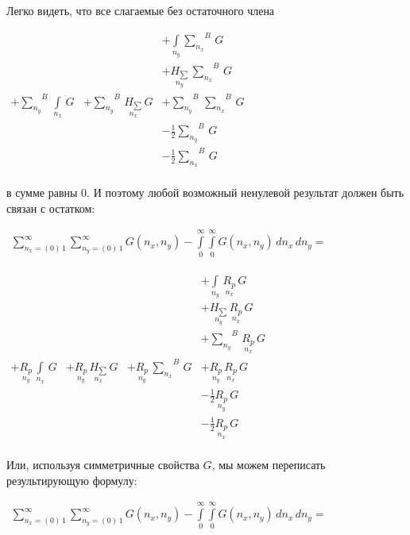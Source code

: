 \documentclass[11pt]{article}
\begin{document}
    Легко видеть, что все слагаемые без остаточного члена

    \(\begin{array}{llll}  \,&  \,&  + \int\limits_{n_y}^{}{\sum\limits_{n_x}^{}}^{B}\,G \\  \,&  \,&  + \underset{n_y}{H_{\sum}}\,{\sum\limits_{n_x}^{}}^{B}\,G \\  + {\sum\limits_{n_y}^{}}^{B}\,\int\limits_{n_x}^{}\,G &  + {\sum\limits_{n_y}^{}}^{B}\,\underset{n_x}{H_{\sum}}\,G &  + {\sum\limits_{n_y}^{}}^{B}\,{\sum\limits_{n_x}^{}}^{B}\,G\\  \,&  \,&  - \frac{1}{2}{\sum\limits_{n_y}^{}}^{B}\,G \\  \,&  \,&  - \frac{1}{2}{\sum\limits_{n_x}^{}}^{B}\,G \\ \end{array}\)

    в сумме равны 0. И поэтому любой возможный ненулевой результат должен
быть связан с остатком:

    \(\begin{array}{r} \sum\limits_{n_x=\left(0\right)\,1}^{\infty} \sum\limits_{n_y=\left(0\right)\,1}^{\infty} G\left(n_x, n_y\right) - \int\limits_{0}^{\infty} \int\limits_{0}^{\infty} G\left(n_x, n_y\right)\,d{n_x}\,d{n_y} = \end{array}\)

    \(\begin{array}{llll}  \,&  \,&  \,&  + \int\limits_{n_y}^{}\,\underset{n_x}{R_{p}}\,G \\  \,&  \,&  \,&  + \underset{n_y}{H_{\sum}}\,\underset{n_x}{R_{p}}\,G \\  \,&  \,&  \,&  + {\sum\limits_{n_y}^{}}^{B}\,\underset{n_x}{R_{p}}\,G \\  + \underset{n_y}{R_{p}}\,\int\limits_{n_x}^{}\,G &  + \underset{n_y}{R_{p}}\,\underset{n_x}{H_{\sum}}\,G &  + \underset{n_y}{R_{p}}\,{\sum\limits_{n_x}^{}}^{B}\,G &  + \underset{n_y}{R_{p}}\,\underset{n_x}{R_{p}}\,G \\  \,&  \,&  \,&  - \frac{1}{2}\underset{n_y}{R_{p}}\,G \\  \,&  \,&  \,&  - \frac{1}{2}\underset{n_x}{R_{p}}\,G \\ \end{array}\)

    Или, используя симметричные свойства \(G\), мы можем переписать
результирующую формулу:

    \(\begin{array}{r} \sum\limits_{n_x=\left(0\right)\,1}^{\infty} \sum\limits_{n_y=\left(0\right)\,1}^{\infty} G\left(n_x, n_y\right) - \int\limits_{0}^{\infty} \int\limits_{0}^{\infty} G\left(n_x, n_y\right)\,d{n_x}\,d{n_y} = \end{array}\)
\end{document}
